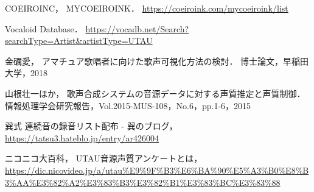 \documentclass[a4j,8pt,twocolumn]{extarticle}
\begin{document}
\begin{thebibliography}{9}
COEIROINC，
MYCOEIROINK．
\url{https://coeiroink.com/mycoeiroink/list}

Vocaloid Database．
\url{https://vocadb.net/Search?searchType=Artist&artistType=UTAU}

金礪愛，
アマチュア歌唱者に向けた歌声可視化方法の検討．
博士論文，早稲田大学，2018

山根壮一ほか，
歌声合成システムの音源データに対する声質推定と声質制御．
情報処理学会研究報告，Vol.2015-MUS-108，No.6，pp.1-6，2015

巽式 連続音の録音リスト配布 - 巽のブログ，
\url{https://tatsu3.hateblo.jp/entry/ar426004}

ニコニコ大百科，
UTAU音源声質アンケートとは，
\url{https://dic.nicovideo.jp/a/utau%E9%9F%B3%E6%BA%90%E5%A3%B0%E8%B3%AA%E3%82%A2%E3%83%B3%E3%82%B1%E3%83%BC%E3%83%88}

\end{thebibliography}


\end{document}
